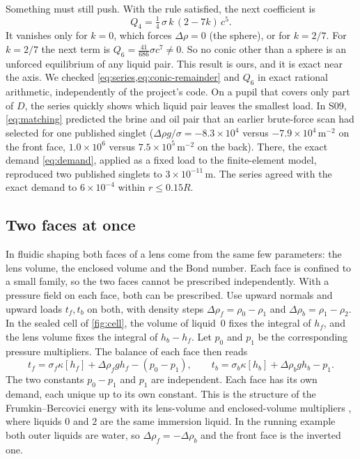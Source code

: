 \documentclass[11pt,a4paper]{article}
\numberwithin{equation}{section}
\begin{document}
Something must still push. With the rule satisfied, the next coefficient is
\begin{equation}
 Q_4=\tfrac14\,\sigma\,k\,(2-7k)\,c^5 .
 \label{eq:conic-remainder}
\end{equation}
It vanishes only for $k=0$, which forces $\Delta\rho=0$ (the sphere), or for
$k=2/7$. For $k=2/7$ the next term is $Q_6=\tfrac{41}{686}\sigma c^7\ne0$. So
no conic other than a sphere is an unforced equilibrium of any liquid pair.
This result is ours, and it is exact near the axis. We checked
\cref{eq:series,eq:conic-remainder} and $Q_6$ in exact rational arithmetic,
independently of the project's code. On a pupil that covers only part of $D$,
the series quickly shows which liquid pair leaves the smallest load. In S09,
\cref{eq:matching} predicted the brine and oil pair that an earlier brute-force
scan had selected for one published singlet ($\Delta\rho g/\sigma=-8.3\times10^4$
versus $-7.9\times10^4\,\mathrm m^{-2}$ on the front face, $1.0\times10^6$ versus
$7.5\times10^5\,\mathrm m^{-2}$ on the back). There, the exact demand
\cref{eq:demand}, applied as a fixed load to the finite-element model,
reproduced two published singlets to $3\times10^{-11}$\,m. The series agreed with
the exact demand to $6\times10^{-4}$ within $r\le0.15R$.

\subsection{Two faces at once}\label{sec:twoface}
In fluidic shaping both faces of a lens come from the same few parameters:
the lens volume, the enclosed volume and the Bond number. Each face is confined
to a small family, so the two faces cannot be prescribed independently. With a
pressure field on each face, both can be prescribed. Use upward normals and upward loads $t_f,t_b$ on both,
with density steps $\Delta\rho_f=\rho_0-\rho_1$ and $\Delta\rho_b=\rho_1-\rho_2$.
In the sealed cell of \cref{fig:cell}, the volume of liquid~0 fixes the integral
of $h_f$, and the lens volume fixes the integral of $h_b-h_f$. Let $p_0$ and
$p_1$ be the corresponding pressure multipliers. The balance of each face then
reads
\begin{equation}
 t_f=\sigma_f\kappa[h_f]+\Delta\rho_fgh_f-(p_0-p_1),\qquad
 t_b=\sigma_b\kappa[h_b]+\Delta\rho_bgh_b-p_1 .
 \label{eq:two-face}
\end{equation}
The two constants $p_0-p_1$ and $p_1$ are independent. Each face has its own
demand, each unique up to its own constant. This is the structure of the
Frumkin--Bercovici energy with its lens-volume and enclosed-volume multipliers
\cite{frumkin2021}, where liquids $0$ and $2$ are the same immersion liquid.
In the running example both outer liquids are water, so $\Delta\rho_f=-\Delta\rho_b$
and the front face is the inverted one.
\end{document}
